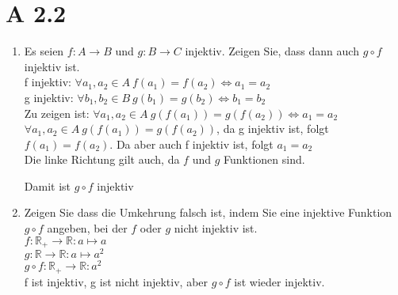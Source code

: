 \documentclass{article}
\begin{document}
        \section*{A 2.2}
            \begin{enumerate}[label = (\roman*)]
                \item Es seien \(f: A \to B\) und \(g: B \to C\) injektiv. Zeigen Sie, dass dann auch \(g \circ f\) injektiv ist. \\
                f injektiv: \(\forall a_1, a_2 \in A \: f(a_1)=f(a_2) \Leftrightarrow a_1 = a_2\) \\
                g injektiv: \(\forall b_1, b_2 \in B \: g(b_1)=g(b_2) \Leftrightarrow b_1 = b_2\) \\
                Zu zeigen ist: \(\forall a_1, a_2 \in A \: g(f(a_1)) = g(f(a_2)) \Leftrightarrow a_1 = a_2 \) \\
                \(\forall a_1, a_2 \in A \: g(f(a_1)) = g(f(a_2))\), da g injektiv ist, folgt \(f(a_1) = f(a_2)\). Da aber auch f injektiv ist, folgt
                \(a_1 = a_2\) \\
                Die linke Richtung gilt auch, da \(f\) und \(g\) Funktionen sind.
                
                Damit ist \(g \circ f\) injektiv

                \item Zeigen Sie dass die Umkehrung falsch ist, indem Sie eine injektive Funktion \(g \circ f\) angeben, bei der \(f\) oder \(g\) nicht injektiv ist.\\
                \(f: \mathbb{R}_+ \to \mathbb{R}: a \mapsto a\) \\
                \(g: \mathbb{R} \to \mathbb{R}: a \mapsto a^2\) \\
                \(g \circ f: \mathbb{R}_+ \to \mathbb{R}: a^2\) \\
                f ist injektiv, g ist nicht injektiv, aber \(g \circ f\) ist wieder injektiv.
            \end{enumerate}
\end{document}
